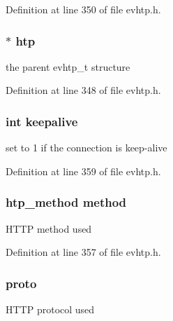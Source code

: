 Definition at line 350 of file evhtp.h.

\hypertarget{structevhtp__request__s_ad2f5cc5c9e97f75f1fe923c57af9e875}{
\subsubsection[{htp}]{$\ast$ {\bf htp}}}
\label{structevhtp__request__s_ad2f5cc5c9e97f75f1fe923c57af9e875}
the parent evhtp\_\-t structure 

Definition at line 348 of file evhtp.h.

\hypertarget{structevhtp__request__s_ae314c4b48027be9feab52906b6313b73}{
\subsubsection[{keepalive}]{\setlength{\rightskip}{0pt plus 5cm}int {\bf keepalive}}}
\label{structevhtp__request__s_ae314c4b48027be9feab52906b6313b73}
set to 1 if the connection is keep-\/alive 

Definition at line 359 of file evhtp.h.

\hypertarget{structevhtp__request__s_a5322aefd6f774a31c7cbfaeee0d3a417}{
\subsubsection[{method}]{\setlength{\rightskip}{0pt plus 5cm}htp\_\-method {\bf method}}}
\label{structevhtp__request__s_a5322aefd6f774a31c7cbfaeee0d3a417}
HTTP method used 

Definition at line 357 of file evhtp.h.

\hypertarget{structevhtp__request__s_a3acae974abf6e95063cab796fbe2a7f6}{
\subsubsection[{proto}]{ {\bf proto}}}
\label{structevhtp__request__s_a3acae974abf6e95063cab796fbe2a7f6}
HTTP protocol used 

